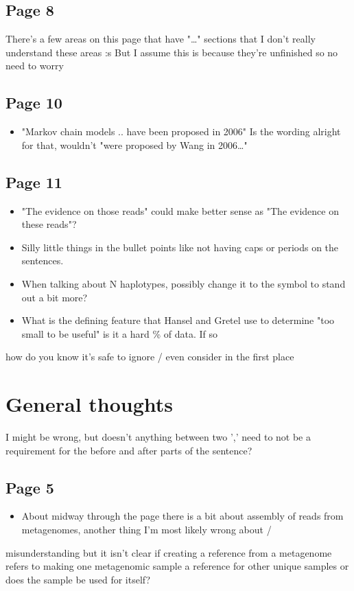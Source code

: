 \documentclass[11pt]{article}
\begin{document}
\subsection{Page 8}
\label{sec-3-3}
There's a few areas on this page that have "\ldots{}" sections that I don't really understand these areas :s 
But I assume this is because they're unfinished so no need to worry 

\subsection{Page 10}
\label{sec-3-4}
\begin{itemize}
\item "Markov chain models .. have been proposed in 2006" Is the wording alright for that, wouldn't "were proposed by Wang in 2006\ldots{}"
\end{itemize}

\subsection{Page 11}
\label{sec-3-5}
\begin{itemize}
\item "The evidence on those reads" could make better sense as "The evidence on these reads"?

\item Silly little things in the bullet points like not having caps or periods on the sentences.

\item When talking about N haplotypes, possibly change it to the  symbol to stand out a bit more?

\item What is the defining feature that Hansel and Gretel use to determine "too small to be useful" is it a hard \% of data. If so
\end{itemize}
how do you know it's safe to ignore / even consider in the first place

\section{General thoughts}
\label{sec-4}
I might be wrong, but doesn't anything between two ',' need to not be a requirement for the before and after parts of the sentence? 

\subsection{Page 5}
\label{sec-4-1}
\begin{itemize}
\item About midway through the page there is a bit about assembly of reads from metagenomes, another thing I'm most likely wrong about /
\end{itemize}
misunderstanding but it isn't clear if creating a reference from a metagenome refers to making one metagenomic sample a reference for other
unique samples or does the sample be used for itself? 
\end{document}
